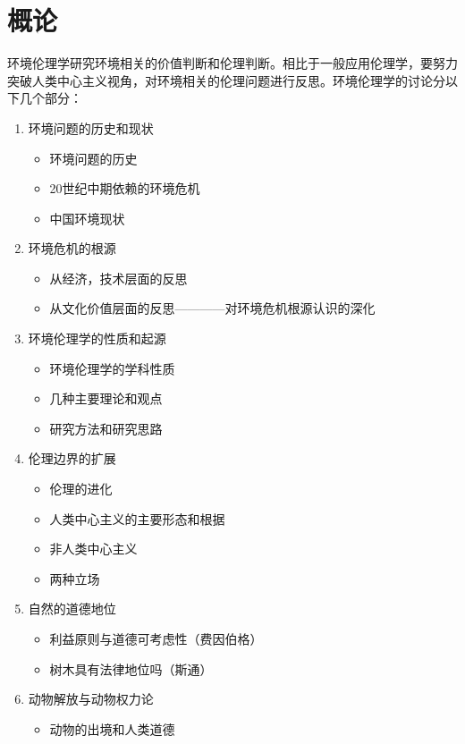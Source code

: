 \documentclass{ctexart}
\begin{document}
\section{概论}

环境伦理学研究环境相关的价值判断和伦理判断。相比于一般应用伦理学，要努力突破人类中心主义视角，对环境相关的伦理问题进行反思。环境伦理学的讨论分以下几个部分：

\begin{enumerate}
    \item 环境问题的历史和现状
    \begin{itemize}
        \item 环境问题的历史
        \item 20世纪中期依赖的环境危机
        \item 中国环境现状
    \end{itemize}
    \item 环境危机的根源
    \begin{itemize}
        \item 从经济，技术层面的反思
        \item 从文化价值层面的反思————对环境危机根源认识的深化
    \end{itemize}
    \item 环境伦理学的性质和起源
    \begin{itemize}
        \item 环境伦理学的学科性质
        \item 几种主要理论和观点
        \item 研究方法和研究思路
    \end{itemize}
    \item 伦理边界的扩展
    \begin{itemize}
        \item 伦理的进化
        \item 人类中心主义的主要形态和根据
        \item 非人类中心主义
        \item 两种立场
    \end{itemize}
    \item 自然的道德地位
    \begin{itemize}
        \item 利益原则与道德可考虑性（费因伯格）
        \item 树木具有法律地位吗（斯通）
    \end{itemize}
    \item 动物解放与动物权力论
    \begin{itemize}
        \item 动物的出境和人类道德

\end{itemize}
\end{enumerate}
\end{document}
